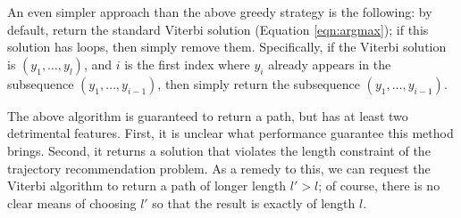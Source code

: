 
An even simpler approach than the above greedy strategy is the following:
by default, return the standard Viterbi solution (Equation \ref{eqn:argmax});
if this solution has loops, then simply remove them.
Specifically, if the Viterbi solution is $( y_1, \ldots, y_l )$,
and $i$ is the first index where $y_i$ already appears in the subsequence $( y_1, \ldots, y_{i-1} )$,
then simply return the subsequence $( y_1, \ldots, y_{i-1} )$.

The above algorithm is guaranteed to return a path,
but has at least two detrimental features.
First, it is unclear what performance guarantee this method brings.
Second, it returns a solution that violates the length constraint of the trajectory recommendation problem.
As a remedy to this, we can request the Viterbi algorithm to return a path of longer length $l' > l$;
of course, there is no clear means of choosing $l'$ so that the result is exactly of length $l$.

